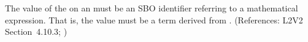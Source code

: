 The value of the   on an \InitialAssignment must be an
SBO identifier referring to a mathematical expression.  That is, the value
must be a term derived from \sbomathformula.  (References: L2V2 Section~4.10.3;
)
